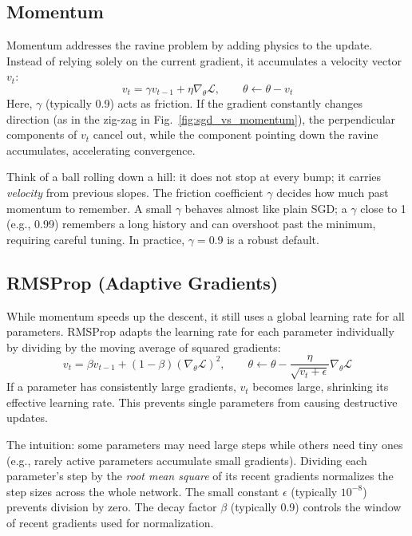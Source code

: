 \documentclass{tufte-handout}
\let\subsubsection\subsection
\begin{document}
\subsubsection{Momentum}
Momentum addresses the ravine problem by adding physics to the update. Instead of relying solely on the current gradient, it accumulates a velocity vector $v_t$:
\[
v_t = \gamma v_{t-1} + \eta \nabla_\theta \mathcal{L}, \qquad \theta \leftarrow \theta - v_t
\]
Here, $\gamma$ (typically 0.9) acts as friction. If the gradient constantly changes direction (as in the zig-zag in Fig.~\ref{fig:sgd_vs_momentum}), the perpendicular components of $v_t$ cancel out, while the component pointing down the ravine accumulates, accelerating convergence.

Think of a ball rolling down a hill: it does not stop at every bump; it carries \emph{velocity} from previous slopes. The friction coefficient $\gamma$ decides how much past momentum to remember. A small $\gamma$ behaves almost like plain SGD; a $\gamma$ close to 1 (e.g., 0.99) remembers a long history and can overshoot past the minimum, requiring careful tuning. In practice, $\gamma = 0.9$ is a robust default.

\subsubsection{RMSProp (Adaptive Gradients)}
While momentum speeds up the descent, it still uses a global learning rate for all parameters. RMSProp adapts the learning rate for each parameter individually by dividing by the moving average of squared gradients:
\[
v_t = \beta v_{t-1} + (1-\beta)(\nabla_\theta \mathcal{L})^2, \qquad \theta \leftarrow \theta - \frac{\eta}{\sqrt{v_t + \epsilon}} \nabla_\theta \mathcal{L}
\]
If a parameter has consistently large gradients, $v_t$ becomes large, shrinking its effective learning rate. This prevents single parameters from causing destructive updates.

The intuition: some parameters may need large steps while others need tiny ones (e.g., rarely active parameters accumulate small gradients). Dividing each parameter's step by the \emph{root mean square} of its recent gradients normalizes the step sizes across the whole network. The small constant $\epsilon$ (typically $10^{-8}$) prevents division by zero. The decay factor $\beta$ (typically 0.9) controls the window of recent gradients used for normalization.
\end{document}
